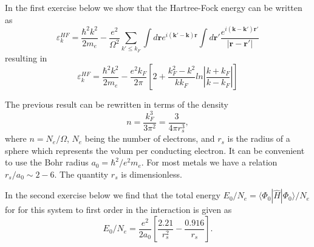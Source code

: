 \documentclass[%
twoside,                 %
final,                   %
10pt]{article}
\begin{document}
In the first exercise below we show that the Hartree-Fock energy can be written as 
\[
\varepsilon_{k}^{HF}=\frac{\hbar^{2}k^{2}}{2m_e}-\frac{e^{2}}
{\Omega^{2}}\sum_{k'\leq
k_{F}}\int d\mathbf{r}e^{i(\mathbf{k}'-\mathbf{k})\mathbf{r}}\int
d\mathbf{r'}\frac{e^{i(\mathbf{k}-\mathbf{k}')\mathbf{r}'}}
{\vert\mathbf{r}-\mathbf{r}'\vert}
\]
resulting in
\[
\varepsilon_{k}^{HF}=\frac{\hbar^{2}k^{2}}{2m_e}-\frac{e^{2}
k_{F}}{2\pi}
\left[
2+\frac{k_{F}^{2}-k^{2}}{kk_{F}}ln\left\vert\frac{k+k_{F}}
{k-k_{F}}\right\vert
\right]
\]



The previous result can be rewritten in terms of the density
\[
n= \frac{k_F^3}{3\pi^2}=\frac{3}{4\pi r_s^3},
\]
where $n=N_e/\Omega$, $N_e$ being the number of electrons, and $r_s$ is the radius of a sphere which represents the volum per conducting electron.  
It can be convenient to use the Bohr radius $a_0=\hbar^2/e^2m_e$.
For most metals we have a relation $r_s/a_0\sim 2-6$.  The quantity $r_s$ is dimensionless.


In the second exercise below  we find that
the total energy
$E_0/N_e=\langle\Phi_{0}|\hat{H}|\Phi_{0}\rangle/N_e$ for
for this system to first order in the interaction is given as 
\[
E_0/N_e=\frac{e^2}{2a_0}\left[\frac{2.21}{r_s^2}-\frac{0.916}{r_s}\right].
\]
\end{document}
